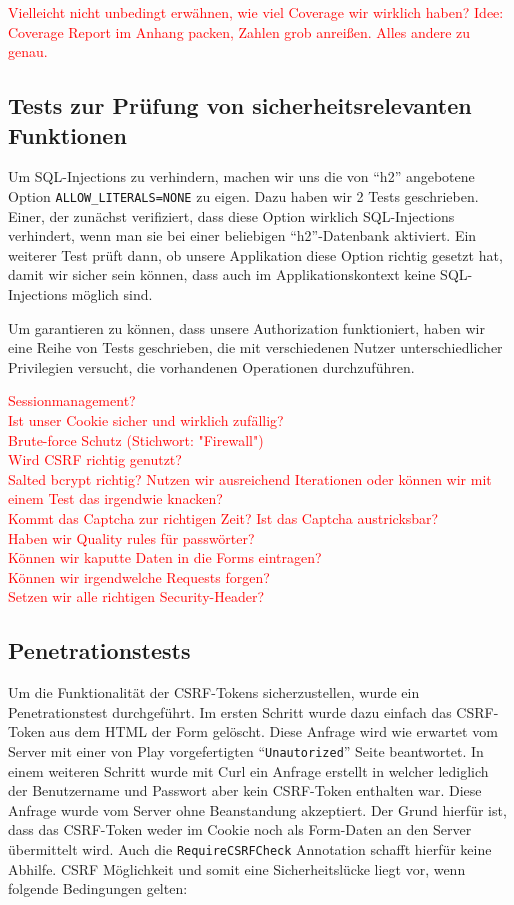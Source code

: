 \documentclass[12pt,DIV14,BCOR10mm,a4paper,twoside,parskip=half-,headsepline,headinclude,english,ngerman,bibliography=totocnumbered]{scrreprt}
\begin{document}
\textcolor{red}{
Vielleicht nicht unbedingt erwähnen, wie viel Coverage wir wirklich haben?
Idee: Coverage Report im Anhang packen, Zahlen grob anreißen. Alles andere zu genau.
}

\subsection{Tests zur Prüfung von sicherheitsrelevanten Funktionen}

Um SQL-Injections zu verhindern, machen wir uns die von \enquote{h2} angebotene Option \texttt{ALLOW\_LITERALS=NONE} zu eigen.
Dazu haben wir 2 Tests geschrieben.
Einer, der zunächst verifiziert, dass diese Option wirklich SQL-Injections verhindert, wenn man sie bei einer beliebigen \enquote{h2}-Datenbank aktiviert.
Ein weiterer Test prüft dann, ob unsere Applikation diese Option richtig gesetzt hat, damit wir sicher sein können, dass auch im Applikationskontext keine SQL-Injections möglich sind.

Um garantieren zu können, dass unsere Authorization funktioniert, haben wir eine Reihe von Tests geschrieben, die mit verschiedenen Nutzer unterschiedlicher Privilegien versucht, die vorhandenen Operationen durchzuführen.

\textcolor{red}{
Sessionmanagement? \\
Ist unser Cookie sicher und wirklich zufällig? \\
Brute-force Schutz (Stichwort: "Firewall") \\
Wird CSRF richtig genutzt? \\
Salted bcrypt richtig? Nutzen wir ausreichend Iterationen oder können wir mit einem Test das irgendwie knacken? \\
Kommt das Captcha zur richtigen Zeit? Ist das Captcha austricksbar? \\
Haben wir Quality rules für passwörter? \\
Können wir kaputte Daten in die Forms eintragen? \\
Können wir irgendwelche Requests forgen? \\
Setzen wir alle richtigen Security-Header? \\
}

\subsection{Penetrationstests}
Um die Funktionalität der CSRF-Tokens sicherzustellen, wurde ein Penetrationstest durchgeführt. Im ersten Schritt wurde dazu einfach das CSRF-Token aus dem HTML der Form gelöscht. Diese Anfrage wird wie erwartet vom Server mit einer von Play vorgefertigten \enquote{\texttt{Unautorized}} Seite beantwortet. In einem weiteren Schritt wurde mit Curl ein Anfrage erstellt in welcher lediglich der Benutzername und Passwort aber kein CSRF-Token enthalten war. Diese Anfrage wurde vom Server ohne Beanstandung akzeptiert. Der Grund hierfür ist, dass das CSRF-Token weder im Cookie noch als Form-Daten an den Server übermittelt wird. Auch die \texttt{RequireCSRFCheck} Annotation schafft hierfür keine Abhilfe. CSRF Möglichkeit und somit eine Sicherheitslücke liegt vor, wenn folgende Bedingungen gelten:
\end{document}
